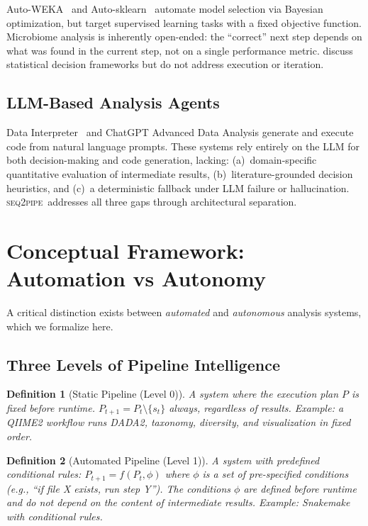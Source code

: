 \documentclass[11pt,a4paper]{article}
\newtheorem{definition}{Definition}
\newcommand{\seqpipe}{\textsc{seq2pipe}}
\begin{document}
Auto-WEKA~\citep{autoweka} and Auto-sklearn~\citep{autosklearn}
automate model selection via Bayesian optimization, but target
supervised learning tasks with a fixed objective function.
Microbiome analysis is inherently open-ended: the ``correct'' next
step depends on what was found in the current step, not on a single
performance metric.
\citet{wasserstein2019} discuss statistical decision frameworks but
do not address execution or iteration.

\subsection{LLM-Based Analysis Agents}

Data Interpreter~\citep{hong2024data} and ChatGPT Advanced Data
Analysis generate and execute code from natural language prompts.
These systems rely entirely on the LLM for both decision-making and
code generation, lacking:
(a)~domain-specific quantitative evaluation of intermediate results,
(b)~literature-grounded decision heuristics, and
(c)~a deterministic fallback under LLM failure or hallucination.
\seqpipe\ addresses all three gaps through architectural separation.

\section{Conceptual Framework: Automation vs Autonomy}
\label{sec:concept}

A critical distinction exists between \emph{automated} and
\emph{autonomous} analysis systems, which we formalize here.

\subsection{Three Levels of Pipeline Intelligence}

\begin{definition}[Static Pipeline (Level 0)]
A system where the execution plan $P$ is fixed before runtime.
$P_{t+1} = P_t \setminus \{s_t\}$ always, regardless of results.
Example: a QIIME2 workflow runs DADA2, taxonomy, diversity, and
visualization in fixed order.
\end{definition}

\begin{definition}[Automated Pipeline (Level 1)]
A system with predefined conditional rules:
$P_{t+1} = f(P_t, \phi)$ where $\phi$ is a set of
\emph{pre-specified} conditions (e.g., ``if file X exists, run
step Y'').
The conditions $\phi$ are defined before runtime and do not depend
on the \emph{content} of intermediate results.
Example: Snakemake with conditional rules.
\end{definition}
\end{document}
